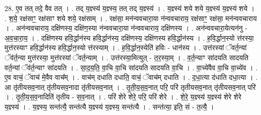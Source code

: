 \documentclass[17pt]{extarticle}
\begin{document}
28. ए॒व तत् तदे॒ वैव तत् । . तद् य॒ज्ञ्स्य॑ य॒ज्ञ्स्य॒ तत् तद् य॒ज्ञ्स्य॑ । . य॒ज्ञ्स्य॑ शये शये य॒ज्ञ्स्य॑ य॒ज्ञ्स्य॑ शये । . श॒ये॒ रक्ष॑साꣳ॒॒ रक्ष॑साꣳ शये शये॒ रक्ष॑साम् । . रक्ष॑सा॒ मन॑न्ववचारा॒या न॑न्ववचाराय॒ रक्ष॑साꣳ॒॒ रक्ष॑सा॒ मन॑न्ववचाराय । . अन॑न्ववचाराय॒ दक्षि॑णस्य॒ दक्षि॑ण॒स्या न॑न्ववचारा॒या न॑न्ववचाराय॒ दक्षि॑णस्य । . अन॑न्ववचारा॒येत्यन॑नु - अ॒व॒चा॒रा॒य॒ । . दक्षि॑णस्य हवि॒र्द्धान॑स्य हवि॒र्द्धान॑स्य॒ दक्षि॑णस्य॒ दक्षि॑णस्य हवि॒र्द्धान॑स्य । . ह॒वि॒र्द्धान॒स्यो त्त॑रस्या॒ मुत्त॑रस्याꣳ हवि॒र्द्धान॑स्य हवि॒र्द्धान॒स्यो त्त॑रस्याम् । . ह॒वि॒र्द्धान॒स्येति॑ हविः - धान॑स्य । . उत्त॑रस्यां ॅवर्त॒न्यां ॅव॑र्त॒न्या मुत्त॑रस्या॒ मुत्त॑रस्यां ॅवर्त॒न्याम् । . उत्त॑रस्या॒मित्युत् - त॒र॒स्या॒म् । . व॒र्त॒न्याꣳ सा॑दयति सादयति वर्त॒न्यां ॅव॑र्त॒न्याꣳ सा॑दयति । . सा॒द॒य॒ति॒ वा॒चि वा॒चि सा॑दयति सादयति वा॒चि । . वा॒च्ये॑वैव वा॒चि वा॒च्ये॑व । . ए॒व वाचं॒ ॅवाच॑ मे॒वैव वाच᳚म् । . वाच॑म् दधाति दधाति॒ वाचं॒ ॅवाच॑म् दधाति । . द॒धा॒त्या द॑धाति दधा॒त्या । . आ तृ॑तीयसव॒नात् तृ॑तीयसव॒नादा तृ॑तीयसव॒नात् । . तृ॒ती॒य॒स॒व॒नात् परि॒ परि॑ तृतीयसव॒नात् तृ॑तीयसव॒नात् परि॑ । . तृ॒ती॒य॒स॒व॒नादिति॑ तृतीय - स॒व॒नात् । . परि॑ शेरे शेरे॒ परि॒ परि॑ शेरे । . शे॒रे॒ य॒ज्ञ्स्य॑ य॒ज्ञ्स्य॑ शेरे शेरे य॒ज्ञ्स्य॑ । . य॒ज्ञ्स्य॒ सन्त॑त्यै॒ सन्त॑त्यै य॒ज्ञ्स्य॑ य॒ज्ञ्स्य॒ सन्त॑त्यै । . सन्त॑त्या॒ इति॒ सं - त॒त्यै॒ । \newline
\end{document}
